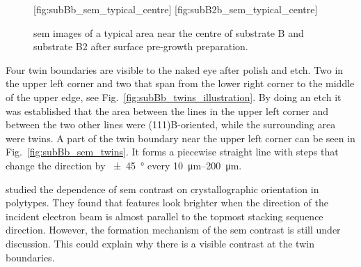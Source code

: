 
\begin{figure}[htbp]
    [fig:subBb_sem_typical_centre]
    \hfill
    [fig:subB2b_sem_typical_centre]
    \caption[\Ac{sem} images of typical areas on substrate B and B2 with surface pre-growth preparation.]{\Ac{sem} images of a typical area near the centre of  substrate B and  substrate B2 after surface pre-growth preparation. }\label{fig:subBb_and_subB2b_sem_typical}
\end{figure}

Four twin boundaries are visible to the naked eye after polish and etch. Two in the upper left corner and two that span from the lower right corner to the middle of the upper edge, see Fig.~\ref{fig:subBb_twins_illustration}. By doing an  etch it was established that the area between the lines in the upper left corner and between the two other lines were (111)B-oriented, while the surrounding area were twins. A part of the twin boundary near the upper left corner can be seen in Fig.~\ref{fig:subBb_sem_twins}. It forms a piecewise straight line with steps that change the direction by \SI{\pm 45}{\degree} every \SIrange{10}{200}{\micro\metre}.

\citet{ashida2015crystallographic} studied the dependence of \ac{sem} contrast on crystallographic orientation in  polytypes. They found that features look brighter when the direction of the incident electron beam is almost parallel to the topmost stacking sequence direction. However, the formation mechanism of the \ac{sem} contrast is still under discussion. This could explain why there is a visible contrast at the twin boundaries.

